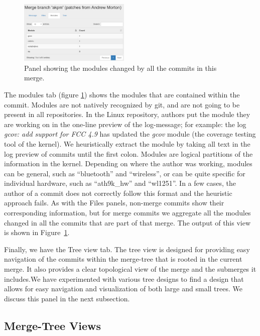 \documentclass[conference, draftclsnofoot, draft]{IEEEtran}
\begin{document}
\begin{figure}
        \centering
        \includegraphics[width=0.47\textwidth]{figures/modules_view_2.png}
        \caption{Panel showing the modules changed by all the commits in this merge.}
        \label{fig:modules}
\end{figure}

The modules tab (figure \ref{fig:modules}) shows the modules that are contained
within the commit. Modules are not natively recognized by git, and are not going to
be present in all repositories.  In the Linux repository, authors put the module
they are working on in the one-line preview of the log-message; for example: the log \emph{gcov: add support for FCC 4.9} has updated the \emph{gcov} module
(the coverage testing tool of the kernel). We heuristically
extract the module by taking all text in the log preview of commits until the first
colon.  Modules are logical partitions of the information in the kernel. Depending
on where the author was working, modules can be general, such as ``bluetooth'' and
``wireless'', or can be quite specific for individual hardware, such as
``ath9k\_hw'' and ``wl1251''. In a few cases, the author of a commit does not
correctly follow this format and the heuristic approach fails. As with the Files panels,
non-merge commits show their corresponding information, but for merge commits we aggregate all the modules changed
in all the commits that are part of that merge.
The output of this view is shown in Figure~\ref{fig:modules}.

Finally, we have the Tree view tab. The tree view is designed for providing easy
navigation of the commits within the merge-tree that is rooted in the current merge. It also provides a clear topological view of the merge and the submerges it includes.We have experimented with various tree designs to find a design that
allows for easy navigation and visualization of both large and small trees.  We discuss this panel in the next subsection.

\subsection{Merge-Tree Views} \label{treeview_section}
\end{document}
